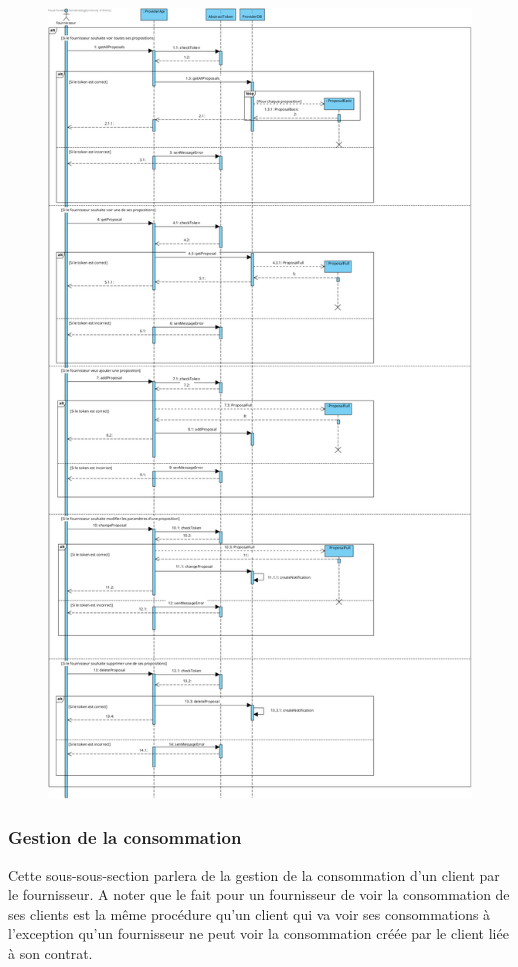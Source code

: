 \newpage
\begin{figure}[h]
    \centering
    \includegraphics[height = 0.7\textheight]{Base/sequence/img/fournisseur/voir-les-propositions.png}
\end{figure}

\newpage
\subsubsection{Gestion de la consommation}
\begin{flushleft}
Cette sous-sous-section parlera de la gestion de la consommation d'un client par le fournisseur. A noter que le fait pour un fournisseur de voir la consommation de ses clients est la même procédure qu'un client qui va voir ses consommations à l'exception qu'un fournisseur ne peut voir la consommation créée par le client liée à son contrat.     
\end{flushleft}

